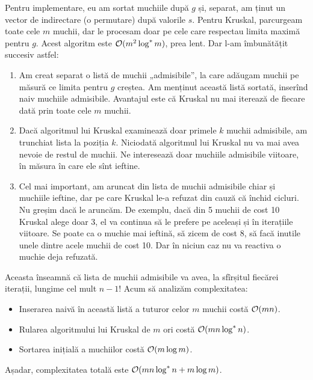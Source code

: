 \documentclass[../main.tex]{subfiles}
\begin{document}
Pentru implementare, eu am sortat muchiile după $g$ și, separat, am ținut un vector de indirectare (o permutare) după valorile $s$. Pentru Kruskal, parcurgeam toate cele $m$ muchii, dar le procesam doar pe cele care respectau limita maximă pentru $g$. Acest algoritm este $\mathcal{O}(m^2 \log^{*} m)$, prea lent. Dar l-am îmbunătățit succesiv astfel:

\begin{enumerate}
  \item Am creat separat o listă de muchii „admisibile”, la care adăugam muchii pe măsură ce limita pentru $g$ creștea. Am menținut această listă sortată, inserînd naiv muchiile admisibile. Avantajul este că Kruskal nu mai iterează de fiecare dată prin toate cele $m$ muchii.

  \item Dacă algoritmul lui Kruskal examinează doar primele $k$ muchii admisibile, am trunchiat lista la poziția $k$. Niciodată algoritmul lui Kruskal nu va mai avea nevoie de restul de muchii. Ne interesează doar muchiile admisibile viitoare, în măsura în care ele sînt ieftine.

  \item Cel mai important, am aruncat din lista de muchii admisibile chiar și muchiile ieftine, dar pe care Kruskal le-a refuzat din cauză că închid cicluri. Nu greșim dacă le aruncăm. De exemplu, dacă din 5 muchii de cost 10 Kruskal alege doar 3, el va continua să le prefere pe aceleași și în iterațiile viitoare. Se poate ca o muchie mai ieftină, să zicem de cost 8, să facă inutile unele dintre acele muchii de cost 10. Dar în niciun caz nu va reactiva o muchie deja refuzată.
\end{enumerate}

Aceasta înseamnă că lista de muchii admisibile va avea, la sfîrșitul fiecărei iterații, lungime cel mult $n-1$! Acum să analizăm complexitatea:

\begin{itemize}
  \item Inserarea naivă în această listă a tuturor celor $m$ muchii costă $\mathcal{O}(mn)$.

  \item Rularea algoritmului lui Kruskal de $m$ ori costă $\mathcal{O}(mn \log^{*} n)$.

  \item Sortarea inițială a muchiilor costă $\mathcal{O}(m \log m)$.
\end{itemize}

Așadar, complexitatea totală este $\mathcal{O}(mn \log^{*} n + m \log m)$.
\end{document}
